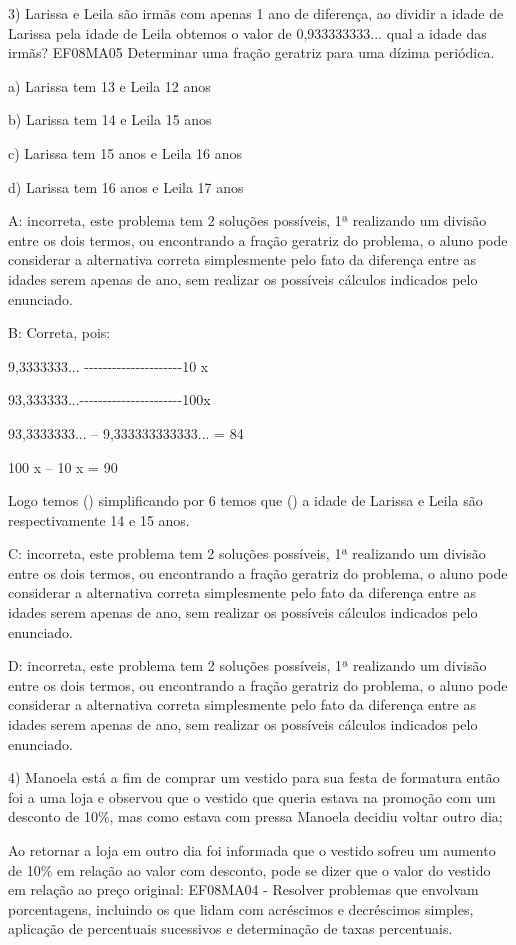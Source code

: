 3) Larissa e Leila são irmãs com apenas 1 ano de diferença, ao dividir a
idade de Larissa pela idade de Leila obtemos o valor de 0,933333333...
qual a idade das irmãs? EF08MA05 Determinar uma fração geratriz para uma
dízima periódica.

a) Larissa tem 13 e Leila 12 anos

b) Larissa tem 14 e Leila 15 anos

c) Larissa tem 15 anos e Leila 16 anos

d) Larissa tem 16 anos e Leila 17 anos

A: incorreta, este problema tem 2 soluções possíveis, 1ª realizando um
divisão entre os dois termos, ou encontrando a fração geratriz do
problema, o aluno pode considerar a alternativa correta simplesmente
pelo fato da diferença entre as idades serem apenas de ano, sem realizar
os possíveis cálculos indicados pelo enunciado.

B: Correta, pois:

9,3333333...
-\/-\/-\/-\/-\/-\/-\/-\/-\/-\/-\/-\/-\/-\/-\/-\/-\/-\/-\/-\/-10 x

93,333333...-\/-\/-\/-\/-\/-\/-\/-\/-\/-\/-\/-\/-\/-\/-\/-\/-\/-\/-\/-\/-\/-100x

93,3333333... -- 9,333333333333... = 84

100 x -- 10 x = 90

Logo temos () simplificando por 6 temos que
() a idade de Larissa e Leila são respectivamente 14 e 15
anos.

C: incorreta, este problema tem 2 soluções possíveis, 1ª realizando um
divisão entre os dois termos, ou encontrando a fração geratriz do
problema, o aluno pode considerar a alternativa correta simplesmente
pelo fato da diferença entre as idades serem apenas de ano, sem realizar
os possíveis cálculos indicados pelo enunciado.

D: incorreta, este problema tem 2 soluções possíveis, 1ª realizando um
divisão entre os dois termos, ou encontrando a fração geratriz do
problema, o aluno pode considerar a alternativa correta simplesmente
pelo fato da diferença entre as idades serem apenas de ano, sem realizar
os possíveis cálculos indicados pelo enunciado.

4) Manoela está a fim de comprar um vestido para sua festa de formatura
então foi a uma loja e observou que o vestido que queria estava na
promoção com um desconto de 10\%, mas como estava com pressa Manoela
decidiu voltar outro dia;

Ao retornar a loja em outro dia foi informada que o vestido sofreu um
aumento de 10\% em relação ao valor com desconto, pode se dizer que o
valor do vestido em relação ao preço original: EF08MA04 - Resolver
problemas que envolvam porcentagens, incluindo os que lidam com
acréscimos e decréscimos simples, aplicação de percentuais sucessivos e
determinação de taxas percentuais.

